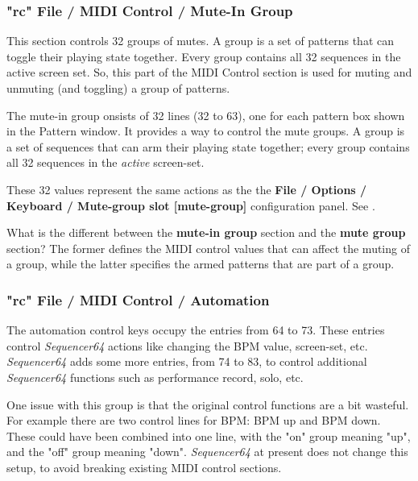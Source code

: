 \subsubsection{"rc" File / MIDI Control / Mute-In Group}
\label{subsubsec:seq64_rc_file_midi_ctrl_mutein}

   This section controls 32 groups of mutes.
   A group is a set of patterns that can toggle their playing state
   together.  Every group contains all 32 sequences in the active screen set.
   So, this part of the MIDI Control section is used for muting and unmuting
   (and toggling) a group of patterns.

   The mute-in group onsists of 32 lines (32 to 63), one for each
   pattern box shown in the Pattern window.
   It provides a way to control the mute groups.
   A group is a set of sequences that can arm their playing state
   together; every group contains all 32 sequences in the
   \textsl{active} screen-set.

   These 32 values represent the same actions as the
   the \textbf{File / Options / Keyboard / Mute-group slot [mute-group]} 
   configuration panel.
   See .

   What is the different between the \textbf{mute-in group}
   section and the \textbf{mute group} section?  The former defines the MIDI
   control values that can affect the muting of a group, while the latter
   specifies the armed patterns that are part of a group.

\subsubsection{"rc" File / MIDI Control / Automation}
\label{subsubsec:seq64_rc_file_midi_ctrl_automation}

   The automation control keys occupy the entries from 64 to 73.
   These entries control
   \textsl{Sequencer64} actions like changing the BPM value, screen-set, etc.
   \textsl{Sequencer64} adds some more entries, from 74 to 83, to control
   additional \textsl{Sequencer64} functions such as performance
   record, solo, etc.
   
   One issue with this group is that the original control functions are a bit
   wasteful.  For example there are two control lines for BPM:  BPM up and BPM
   down.  These could have been combined into one line, with the "on" group
   meaning "up", and the "off" group meaning "down".  
   \textsl{Sequencer64} at present does not change this setup, to avoid
   breaking existing MIDI control sections.

